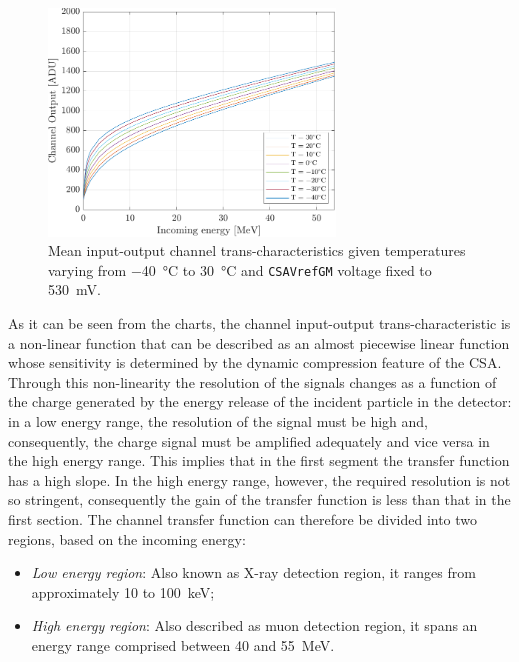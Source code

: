\begin{figure}[h!]
    \centering
    \includegraphics[width=0.68\textwidth]{Images/chap1/results/FDT/fdt_csavrefgm_530mV_tau6_keV.pdf}
    \caption{Mean input-output channel trans-characteristics given temperatures varying from \SI{-40}{\celsius} to \SI{30}{\celsius} and \texttt{CSAVrefGM} voltage fixed to \SI{530}{\milli\volt}.}
    \label{figFDTplot530mV}
\end{figure}

\par
As it can be seen from the charts, the channel input-output trans-characteristic is a non-linear function that can be described as an almost piecewise linear function whose sensitivity is determined by the dynamic compression feature of the CSA. Through this non-linearity the resolution of the signals changes as a function of the charge generated by the energy release of the incident particle in the detector: in a low energy range, the resolution of the signal must be high and, consequently, the charge signal must be amplified adequately and vice versa in the high energy range. This implies that in the first segment the transfer function has a high slope. In the high energy range, however, the required resolution is not so stringent, consequently the gain of the transfer function is less than that in the first section. The channel transfer function can therefore be divided into two regions, based on the incoming energy:

\begin{itemize}
    \itemsep0em
    \item \textit{Low energy region}: Also known as X-ray detection region, it ranges from approximately 10 to \SI{100}{\kilo\electronvolt};
    \item \textit{High energy region}: Also described as muon detection region, it spans an energy range comprised between 40 and \SI{55}{\mega\electronvolt}.
\end{itemize}

